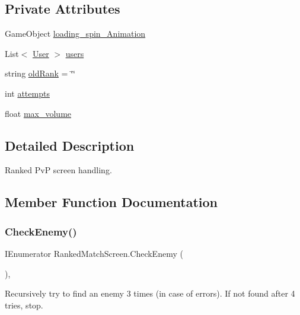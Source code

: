 \subsection*{Private Attributes}
\begin{DoxyCompactItemize}
\item 
Game\+Object \mbox{\hyperlink{class_ranked_match_screen_a07964a0e688df7fac3544ecbacdb1b38}{loading\+\_\+spin\+\_\+\+Animation}}
\item 
List$<$ \mbox{\hyperlink{class_user}{User}} $>$ \mbox{\hyperlink{class_ranked_match_screen_a58808e8b95d7ceae1e2fded90b49a717}{users}}
\item 
string \mbox{\hyperlink{class_ranked_match_screen_a9b7d719703c76fa997c55af096f1f515}{old\+Rank}} = \char`\"{}\char`\"{}
\item 
int \mbox{\hyperlink{class_ranked_match_screen_a98589ae73b128bf087585b9992e42b55}{attempts}}
\item 
float \mbox{\hyperlink{class_ranked_match_screen_a543fa182be7d42093f3da8924e37802e}{max\+\_\+volume}}
\end{DoxyCompactItemize}


\subsection{Detailed Description}
Ranked PvP screen handling. 

\subsection{Member Function Documentation}
\mbox{\label{class_ranked_match_screen_ad61c0cdc08dd280707aa5e4bb29bdb58}} 
\subsubsection{\texorpdfstring{CheckEnemy()}{CheckEnemy()}}
{\footnotesize\ttfamily I\+Enumerator Ranked\+Match\+Screen.\+Check\+Enemy (\begin{DoxyParamCaption}{ }\end{DoxyParamCaption})\hspace{0.3cm}{\ttfamily [inline]}, {\ttfamily [private]}}



Recursively try to find an enemy 3 times (in case of errors). If not found after 4 tries, stop. 


